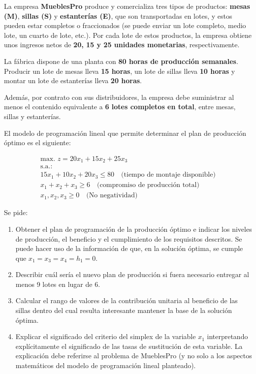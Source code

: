 La empresa \textbf{MueblesPro} produce y comercializa tres tipos de productos: \textbf{mesas (M)}, \textbf{sillas (S)} y \textbf{estanterías (E)}, que son transportadas en lotes, y estos pueden estar completos o fraccionados (se puede enviar un lote completo, medio lote, un cuarto de lote, etc.). Por cada lote de estos productos, la empresa obtiene unos ingresos netos de \textbf{20, 15 y 25 unidades monetarias}, respectivamente.

La fábrica dispone de una planta con \textbf{80 horas de producción semanales}. Producir un lote de mesas lleva \textbf{15 horas}, un lote de sillas lleva \textbf{10 horas} y montar un lote de estanterías lleva \textbf{20 horas}.

Además, por contrato con sus distribuidores, la empresa debe suministrar al menos el contenido equivalente a \textbf{6 lotes completos en total}, entre mesas, sillas y estanterías.

El modelo de programación lineal que permite determinar el plan de producción óptimo es el siguiente:

\begin{equation}
\begin{split}
\text{max. } z = 20x_1 + 15x_2 + 25x_3 \\
\text{s.a.:} \\
15x_1 + 10x_2 + 20x_3 \leq 80 \quad \text{(tiempo de montaje disponible)} \\
x_1 + x_2 + x_3 \geq 6 \quad \text{(compromiso de producción total)} \\
x_1, x_2, x_3 \geq 0 \quad \text{(No negatividad)}
\end{split}
\end{equation}

Se pide:

\begin{enumerate}
    \item Obtener el plan de programación de la producción óptimo e indicar los niveles de producción, el beneficio y el cumplimiento de los requisitos descritos. Se puede hacer uso de la información de que, en la solución óptima, se cumple que $x_1=x_3=x_4=h_1=0$.
    \item Describir cuál sería el nuevo plan de producción si fuera necesario entregar al menos 9 lotes en lugar de 6.
    \item Calcular el rango de valores de la contribución unitaria al beneficio de las sillas dentro del cual resulta interesante mantener la base de la solución óptima.
    \item Explicar el significado del criterio del simplex de la variable $x_1$ interpretando explícitamente el significado de las tasas de sustitución de esta variable. La explicación debe referirse al problema de MueblesPro (y no solo a los aspectos matemáticos del modelo de programación lineal planteado).
\end{enumerate}